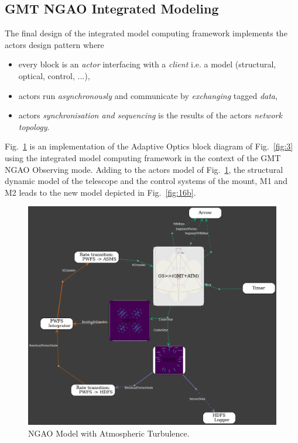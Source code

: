 \documentclass[]{AO4ELT}  %
\begin{document}
\subsection{GMT NGAO Integrated Modeling}
\label{sec:gmt-ngao-im}

The final design of the integrated model computing framework implements the actors design pattern where
\begin{itemize}
   \item every block is an \emph{actor} interfacing with a \emph{client} i.e. a model (structural, optical, control, ...),
   \item actors run \emph{asynchronously} and communicate by \emph{exchanging} tagged \emph{data},
   \item actors \emph{synchronisation and sequencing} is the results of the actors \emph{network topology}.
\end{itemize}

Fig.~\ref{fig:16a} is an implementation of the Adaptive Optics block diagram of Fig.~\ref{fig:3} using the integrated model computing framework in the context of the GMT NGAO Observing mode.
Adding to the actors model of Fig.~\ref{fig:16a}, the structural dynamic model of the telescope and the control systems of the mount, M1 and M2 leads
to the new model depicted in Fig.~\ref{fig:16b}.


\begin{figure}
   \centering
   \includegraphics[width=0.8\linewidth]{NGAO.dot.png}
   \caption{NGAO Model with Atmospheric Turbulence.}
   \label{fig:16a}
\end{figure}
\end{document}
